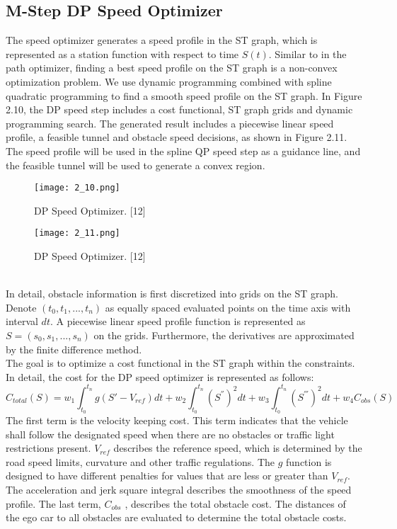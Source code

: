 \documentclass{report}
\begin{document}
\subsection{M-Step DP Speed Optimizer}
The speed optimizer generates a speed profile in the ST graph, which is represented as a station function with respect to time $S(t)$. Similar to in the path optimizer, finding a best speed profile on the ST graph is a non-convex optimization problem. We use dynamic programming combined with spline
quadratic programming to find a smooth speed
profile on the ST graph. In Figure 2.10, the DP speed step includes a cost functional, ST graph grids and dynamic programming search. The generated result includes a piecewise linear speed profile, a feasible tunnel and obstacle speed decisions, as shown in Figure 2.11. The speed profile will be used in the spline QP speed step as a guidance line, and the feasible tunnel will be used to generate a convex region.
  \begin{figure}[ht]
	\centering
	\texttt{[image: 2\_10.png]}
	\caption{DP Speed Optimizer. [12]}
	\label{fig:2.10} 
\end{figure}
  \begin{figure}[ht]
	\centering
	\texttt{[image: 2\_11.png]}
	\caption{DP Speed Optimizer. [12]}
	\label{fig:2.11} 
\end{figure}\\
\indent
In detail, obstacle information is first discretized into grids on the ST graph. Denote $(t_0 , t_1 , ..., t_n)$ as equally spaced evaluated points on the time axis with interval $dt$. A piecewise linear speed profile function is represented as $S = (s_0, s_1 , ..., s_n )$ on the grids. Furthermore, the derivatives are approximated by the finite difference method.\\
\indent
The goal is to optimize a cost functional in the ST graph within the constraints. In detail, the cost for the DP speed optimizer is represented as follows:
\begin{equation}
C_{total}(S) = w_1 \int_{t_0}^{t_n} g(S' - V_{ref})dt + w_2 \int_{t_0}^{t_n}(S^{''})^2dt + w_3 \int_{t_0}^{t_n} (S^{'''})^2dt + w_4 C_{obs}(S)
\end{equation}
The first term is the velocity keeping cost. This term indicates that the vehicle shall follow the designated speed when there are no obstacles or traffic light restrictions present. $V_{ref}$ describes the reference speed, which is determined by the road speed limits, curvature and other traffic regulations. The $g$ function is designed to have different penalties for values that are less or greater than $V_{ref}$. The acceleration and jerk square integral describes the smoothness of the speed profile. The last term, $C_{obs}$ , describes the total obstacle cost. The distances of the ego car to all obstacles are evaluated to determine the total obstacle costs.\\
\end{document}
